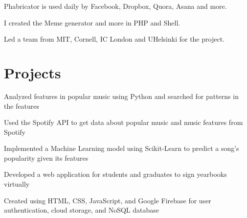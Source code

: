 \documentclass[]{deedy-resume}
\begin{document}
\begin{minipage}[t]{0.66\textwidth}
\begin{tightemize}
\item Phabricator is used daily by Facebook, Dropbox, Quora, Asana and more.
\item I created the Meme generator and more in PHP and Shell.
\item Led a team from MIT, Cornell, IC London and UHelsinki for the project.
\end{tightemize}
\sectionsep


\section{Projects}
\begin{tightemize}
\item Analyzed features in popular music using Python and searched for patterns in the features
\item Used the Spotify API to get data about popular music and music features from Spotify
\item Implemented a Machine Learning model using Scikit-Learn to predict a song's popularity given its features
\end{tightemize}
\sectionsep

\begin{tightemize}
\item Developed a web application for students and graduates to sign yearbooks virtually
\item Created using HTML, CSS, JavaScript, and Google Firebase for user authentication, cloud storage, and NoSQL database
\end{tightemize}
\sectionsep

\sectionsep

%
%
%

\end{minipage} 
\end{document}
